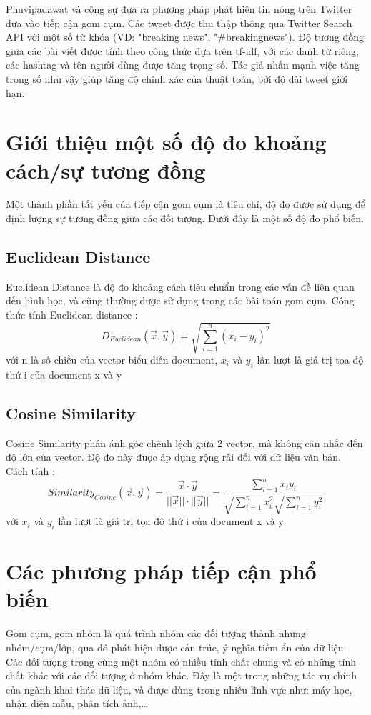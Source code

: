 Phuvipadawat và cộng sự \cite{SwitPhuvipadawat} đưa ra phương pháp phát hiện tin nóng trên Twitter dựa vào tiếp cận gom cụm. Các tweet được thu thập thông qua Twitter Search API với một số từ khóa (VD: "breaking news", "\#breakingnews"). Độ tương đồng giữa các bài viết được tính theo công thức dựa trên tf-idf, với các danh từ riêng, các hashtag và tên người dùng được tăng trọng số. Tác giả nhấn mạnh việc tăng trọng số như vậy giúp tăng độ chính xác của thuật toán, bởi độ dài tweet giới hạn.

\section{Giới thiệu một số độ đo khoảng cách/sự tương đồng} \label{distances}
Một thành phần tất yếu của tiếp cận gom cụm là tiêu chí, độ đo được sử dụng để định lượng sự tương đồng giữa các đối tượng. Dưới đây là một số độ đo phổ biến.
	\subsection*{Euclidean Distance}
	Euclidean Distance là độ đo khoảng cách tiêu chuẩn trong các vấn đề liên quan đến hình học, và cũng thường được sử dụng trong các bài toán gom cụm. Công thức tính Euclidean distance \cite{IntroToIR}:
		\begin{equation}
		D_{Euclidean}(\vec{x}, \vec{y}) = \sqrt{\sum_{i=1}^n (x_i-y_i)^2}
		\end{equation}
	với n là số chiều của vector biểu diễn document, $x_i$ và $y_i$ lần lượt là giá trị tọa độ thứ i của document x và y\\
	
	\subsection*{Cosine Similarity}
	Cosine Similarity phản ánh góc chênh lệch giữa 2 vector, mà không cân nhắc đến độ lớn của vector. Độ đo này được áp dụng rộng rãi đối với dữ liệu văn bản. Cách tính \cite{IntroToIR}: 
		\begin{equation}
		Similarity_{Cosine}(\vec{x}, \vec{y}) = \frac {\vec{x} \cdot \vec{y}}{||\vec{x}|| \cdot ||\vec{y}||} = \frac{\sum_{i=1}^{n}x_iy_i}{\sqrt{\sum_{i=1}^{n}x_i^2} \sqrt{\sum_{i=1}^{n}y_i^2}}	
		\end{equation}
	với  $x_i$ và $y_i$ lần lượt là giá trị tọa độ thứ i của document x và y

\section{Các phương pháp tiếp cận phổ biến}
Gom cụm, gom nhóm là quá trình nhóm các đối tượng thành những nhóm/cụm/lớp, qua đó phát hiện được cấu trúc, ý nghĩa tiềm ẩn của dữ liệu. Các đối tượng trong cùng một nhóm có nhiều tính chất chung và có những tính chất khác với các đối tượng ở nhóm khác. Đây là một trong những tác vụ chính của ngành khai thác dữ liệu, và được dùng trong nhiều lĩnh vực như: máy học, nhận diện mẫu, phân tích ảnh,…

